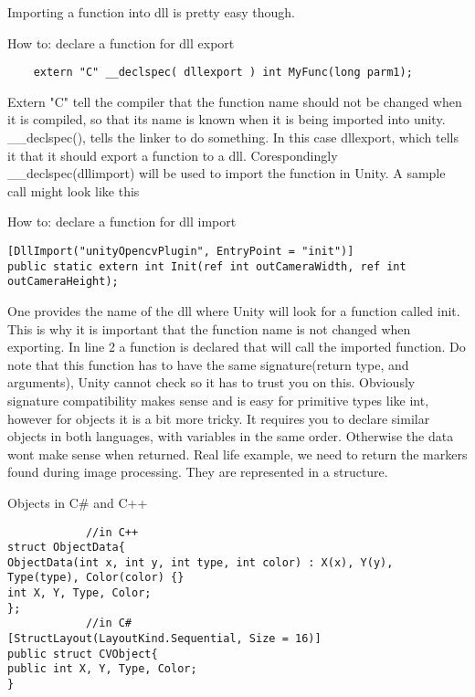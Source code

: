 Importing a function into dll is pretty easy though.
\begin{listing}[H]
	\caption{How to: declare a function for dll export}
	\label{listing:kernels}
	\begin{verbatim}
	extern "C" __declspec( dllexport ) int MyFunc(long parm1);
	\end{verbatim}
\end{listing}
Extern "C" tell the compiler that the function name should not be changed when it is compiled, so that its name is known when it is being imported into unity. \_\_declspec(), tells the linker to do something. In this case dllexport, which tells it that it should export a function to a dll. Corespondingly \_\_declspec(dllimport) will be used to import the function in Unity. A sample call might look like this\\
\begin{listing}[H]
	\caption{How to: declare a function for dll import}
	\label{listing:kernels}
	\begin{verbatim}
[DllImport("unityOpencvPlugin", EntryPoint = "init")]
public static extern int Init(ref int outCameraWidth, ref int outCameraHeight);
	\end{verbatim}
\end{listing}
One provides the name of the dll where Unity will look for a function called init. This is why it is important that the function name is not changed when exporting. In line 2 a function is declared that will call the imported function. Do note that this function has to have the same signature(return type, and arguments), Unity cannot check so it has to trust you on this. Obviously signature compatibility makes sense and is easy for primitive types like int, however for objects it is a bit more tricky. It requires you to declare similar objects in both languages, with variables in the same order. Otherwise the data wont make sense when returned. Real life example, we need to return the markers found during image processing. They are represented in a structure. 
\begin{listing}[H]
	\caption{Objects in C\# and C++}
	\label{listing:kernels}
	\begin{verbatim}
			//in C++
struct ObjectData{
ObjectData(int x, int y, int type, int color) : X(x), Y(y), Type(type), Color(color) {}
int X, Y, Type, Color;
};
			//in C#	
[StructLayout(LayoutKind.Sequential, Size = 16)]
public struct CVObject{
public int X, Y, Type, Color;
}
	\end{verbatim}
\end{listing}
